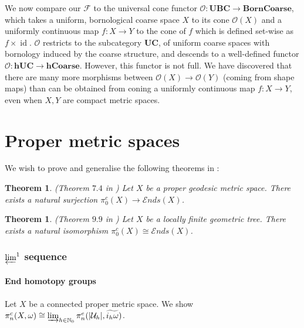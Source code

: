 \documentclass[a4paper,11pt]{article}
\theoremstyle{definition}
\theoremstyle{plain}
\newtheorem{theorem}[definition]{Theorem}
\theoremstyle{remark}
\DeclareMathOperator{\id}{id}
\begin{document}
{We now compare our $\mathcal{F}$ to the universal cone functor $\mathcal{O}:\mathbf{UBC} \rightarrow \mathbf{BornCoarse}$, which takes a uniform, bornological coarse space $X$ to its cone $\mathcal{O}(X)$ and a uniformly continuous map $f: X\rightarrow Y$ to the cone of $f$ which is defined set-wise as $f\times \id$. $\mathcal{O}$ restricts to the subcategory $\mathbf{UC}$, of uniform coarse spaces with bornology induced by the coarse structure, and descends to a well-defined functor $\mathcal{O}: \mathbf{hUC}\rightarrow \mathbf{hCoarse}$. However, this functor is not full. We have discovered that there are many more morphisms between $\mathcal{O}(X)\rightarrow \mathcal{O}(Y)$ (coming from shape maps) than can be obtained from coning a uniformly continuous map $f: X\rightarrow Y$, even when $X,Y$ are compact metric spaces.
\newpage

\part{Proper metric spaces}


We wish to prove and generalise the following theorems in \cite{ashley2025interactions}:

\begin{theorem} \label{surjends} (Theorem $7.4$ in \cite{ashley2025interactions}) Let $X$ be a proper geodesic metric space. There exists a natural surjection $\pi^c_{0}(X)\rightarrow \mathcal{E}nds(X)$. 
\end{theorem}

\begin{theorem}\label{injends} (Theorem $9.9$ in \cite{ashley2025interactions}) Let $X$ be a locally finite geometric tree. There exists a natural isomorphism $\pi^c_{0}(X)\cong \mathcal{E}nds(X)$.
\end{theorem}
\section{$\varprojlim^1$ sequence}

\subsection{End homotopy groups}

Let $X$ be a connected proper metric space. We show $\pi_{n}^{c}(X,\omega)\cong \varinjlim_{h\in \mathbb{N}_{0}}\pi^{e}_{n}(|\mathcal{U}_{h}|, \widetilde{i_{h}\omega})$.\\

}
\end{document}

